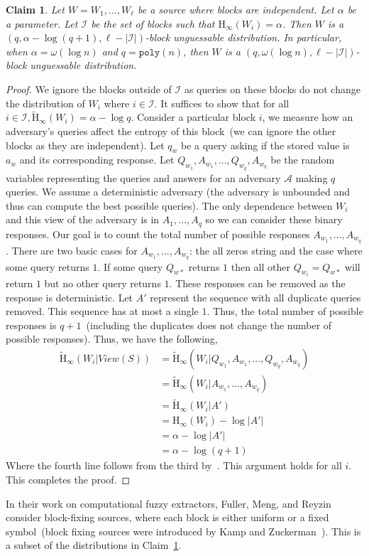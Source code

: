 \documentclass[11pt]{article}
\newcommand{\clref}[1]{\mbox{Claim~\ref{#1}}}
\newcommand{\poly}{\ensuremath{\mathtt{poly}}\xspace}
\newcommand{\Hoo}{\mathrm{H}_\infty}
\newcommand{\Hav}{\tilde{\mathrm{H}}_\infty}
\newtheorem{claim}[theorem]{Claim}
\begin{document}
\begin{claim}
\label{cl:independent high ent}
Let $W = W_1,..., W_\ell$ be a source where blocks are independent.  Let $\alpha$ be a parameter.  Let $\mathcal{I}$ be the set of blocks such that $\Hoo(W_i ) =\alpha $.  Then $W$ is a $(q, \alpha - \log (q+1), \ell - |\mathcal{I}|)$-block unguessable distribution.  In particular, when $\alpha = \omega(\log n)$ and $q = \poly(n)$, then $W$ is a $(q, \omega(\log n), \ell - |\mathcal{I}|)$-block unguessable distribution.
\end{claim}
\begin{proof}
We ignore the blocks outside of $\mathcal{I}$ as queries on these blocks do not change the distribution of $W_i$ where $i\in \mathcal{I}$.  It suffices to show that for all $i\in \mathcal{I}, \Hav(W_i) = \alpha -\log q$.  
Consider a particular block $i$, we measure how an adversary's queries affect the entropy of this block~(we can ignore the other blocks as they are independent).  
Let $q_w$ be a query asking if the stored value is $a_w$ and its corresponding response.  
Let $Q_{w_1},A_{w_1},..., Q_{w_q}, A_{w_q}$ be the random variables representing the queries and answers for an  adversary $\mathcal{A}$ making $q$ queries.  We assume a deterministic adversary (the adversary is unbounded and thus can compute the best possible queries).  The only dependence between $W_i$ and this view of the adversary is in $A_1,..., A_q$ so we can consider these binary responses.  Our goal is to count the total number of possible responses $A_{w_1},..., A_{w_q}$.  There are two basic cases for $A_{w_1},..., A_{w_q}$: the all zeros string and the case where some query returns $1$.  If some query $Q_{w*}$ returns $1$ then all other $Q_{w_i} = Q_{w*}$ will return $1$ but no other query returns $1$.  These responses can be removed as the response is deterministic.  Let $A'$ represent the sequence with all duplicate queries removed.  This sequence has at most a single $1$.  Thus, the total number of possible responses is $q+1$~(including the duplicates does not change the number of possible responses).  Thus, we have the following,
\begin{align*}
\Hav(W_i | View(S)) &= \Hav(W_i| Q_{w_1}, A_{w_1},..., Q_{w_q}, A_{w_q})\\
&=\Hav(W_i | A_{w_1},..., A_{w_q})\\
&=\Hav(W_i |A') \\
&=\Hoo(W_i) - \log |A'|\\
&=\alpha - \log |A'|\\
&=\alpha - \log (q+1)
\end{align*}
Where the fourth line follows from the third by~\cite[Lemma 2.2]{DBLP:journals/siamcomp/DodisORS08}.
This argument holds for all $i$.  This completes the proof.
\end{proof}
In their work on computational fuzzy extractors, Fuller, Meng, and Reyzin~\cite{fuller2013computational} consider block-fixing sources, where each block is either uniform or a fixed symbol~(block fixing sources were introduced by Kamp and Zuckerman~\cite{KZ07}).  This is a subset of the distributions in \clref{cl:independent high ent}.  
\end{document}
